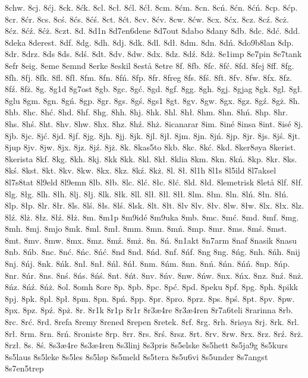 8chw.
8cj.
8ćj.
8ck.
8ćk.
8cl.
8cł.
8ćl.
8ćł.
8cm.
8ćm.
8cn.
8cń.
8ćn.
8ćń.
8cp.
8ćp.
8cr.
8ćr.
8cs.
8cś.
8ćs.
8ćś.
8ct.
8ćt.
8cv.
8ćv.
8cw.
8ćw.
8cx.
8ćx.
8cz.
8cź.
8cż.
8ćz.
8ćź.
8ćż.
8czt.
8d.
8d1n
8d7en6dene
8d7out
8dabo
8dany
8db.
8dc.
8dć.
8dd.
8deka
8derest.
8df.
8dg.
8dh.
8dj.
8dk.
8dl.
8dł.
8dm.
8dn.
8dń.
8do9b8lan
8dp.
8dr.
8drz.
8ds
8ds.
8dś.
8dt.
8dv.
8dw.
8dx.
8dz.
8dź.
8dż.
8e1imp
8e7pin
8e7tank
8efr
8eig.
8eme
8emnd
8erke
8eskil
8estå
8etre
8f.
8fb.
8fc.
8fć.
8fd.
8fej
8ff.
8fg.
8fh.
8fj.
8fk.
8fl.
8fł.
8fm.
8fn.
8fń.
8fp.
8fr.
8freg
8fs.
8fś.
8ft.
8fv.
8fw.
8fx.
8fz.
8fź.
8fż.
8g.
8g1d
8g7ost
8gb.
8gc.
8gć.
8gd.
8gf.
8gg.
8gh.
8gj.
8gjag
8gk.
8gl.
8gł.
8glu
8gm.
8gn.
8gń.
8gp.
8gr.
8gs.
8gś.
8gs1
8gt.
8gv.
8gw.
8gx.
8gz.
8gź.
8gż.
8h.
8hb.
8hc.
8hć.
8hd.
8hf.
8hg.
8hh.
8hj.
8hk.
8hl.
8hł.
8hm.
8hn.
8hń.
8hp.
8hr.
8hs.
8hś.
8ht.
8hv.
8hw.
8hx.
8hz.
8hź.
8hż.
8icanarar
8im.
8iné
8insa
8int.
8isé
8j.
8jb.
8jc.
8jć.
8jd.
8jf.
8jg.
8jh.
8jj.
8jk.
8jl.
8jł.
8jm.
8jn.
8jń.
8jp.
8jr.
8js.
8jś.
8jt.
8jup
8jv.
8jw.
8jx.
8jz.
8jź.
8jż.
8k.
8kas5to
8kb.
8kc.
8kć.
8kd.
8ker8øya
8kerist.
8kerista
8kf.
8kg.
8kh.
8kj.
8kk
8kk.
8kl.
8kł.
8klia
8km.
8kn.
8kń.
8kp.
8kr.
8ks.
8kś.
8kst.
8kt.
8kv.
8kw.
8kx.
8kz.
8kź.
8kż.
8l.
8ł.
8l1h
8l1s
8l5ild
8l7aksel
8l7s8tat
8l9eld
8l9emn
8lb.
8łb.
8lc.
8lć.
8łc.
8łć.
8ld.
8łd.
8lemetrisk
8letå
8lf.
8łf.
8lg.
8łg.
8lh.
8łh.
8lj.
8łj.
8lk.
8łk.
8ll.
8lł.
8łl.
8łł.
8lm.
8łm.
8ln.
8lń.
8łn.
8łń.
8lp.
8łp.
8lr.
8łr.
8ls.
8lś.
8łs.
8łś.
8lsk.
8lt.
8łt.
8lv
8lv.
8łv.
8lw.
8łw.
8lx.
8łx.
8lz.
8lź.
8lż.
8łz.
8łź.
8łż.
8m.
8m1p
8m9idé
8m9uka
8mb.
8mc.
8mć.
8md.
8mf.
8mg.
8mh.
8mj.
8mjo
8mk.
8ml.
8mł.
8mm.
8mn.
8mń.
8mp.
8mr.
8ms.
8mś.
8mst.
8mt.
8mv.
8mw.
8mx.
8mz.
8mź.
8mż.
8n.
8ń.
8n1akt
8n7arm
8naf
8nasik
8nasu
8nb.
8ńb.
8nc.
8nć.
8ńc.
8ńć.
8nd
8nd.
8ńd.
8nf.
8ńf.
8ng
8ng.
8ńg.
8nh.
8ńh.
8nij
8nj.
8ńj.
8nk.
8ńk.
8nl.
8nł.
8ńl.
8ńł.
8nm.
8ńm.
8nn.
8nń.
8ńn.
8ńń.
8np.
8ńp.
8nr.
8ńr.
8ns.
8nś.
8ńs.
8ńś.
8nt.
8ńt.
8nv.
8ńv.
8nw.
8ńw.
8nx.
8ńx.
8nz.
8nź.
8nż.
8ńz.
8ńź.
8ńż.
8ol.
8omh
8ore
8p.
8pb.
8pc.
8pć.
8pd.
8peku
8pf.
8pg.
8ph.
8pikk
8pj.
8pk.
8pl.
8pł.
8pm.
8pn.
8pń.
8pp.
8pr.
8pro.
8prz.
8ps.
8pś.
8pt.
8pv.
8pw.
8px.
8pz.
8pź.
8pż.
8r.
8r1k
8r1p
8r1r
8r3æ4re
8r3æ4ren
8r7a6teli
8rarinna
8rb.
8rc.
8rć.
8rd.
8refa
8remy
8rened
8repen
8retek.
8rf.
8rg.
8rh.
8riøya
8rj.
8rk.
8rl.
8rł.
8rm.
8rn.
8rń.
8roniste
8rp.
8rr.
8rs.
8rś.
8rsz.
8rt.
8rv.
8rw.
8rx.
8rz.
8rź.
8rż.
8rzł.
8s.
8ś.
8s3æ4re
8s3æ4ren
8s3linj
8s3pris
8s5elske
8s5hett
8s5ja9g
8s5kurs
8s5laus
8s5leke
8s5les
8s5løp
8s5meld
8s5tera
8s5u6vi
8s5under
8s7angst
8s7en5trep

